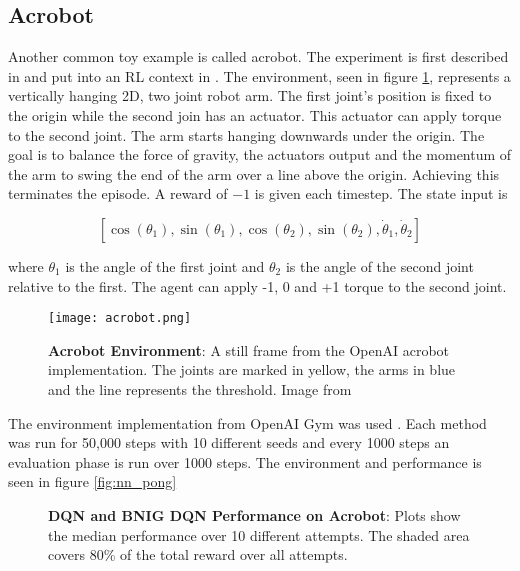 \subsection{Acrobot}

Another common toy example is called acrobot. The experiment is first described in \cite{hauser_1990} and put into an RL context in \cite{sutton_1996}. The environment, seen in figure \ref{fig:acrobot}, represents a vertically hanging 2D, two joint robot arm. The first joint's position is fixed to the origin while the second join has an actuator. This actuator can apply torque to the second joint. The arm starts hanging downwards under the origin. The goal is to balance the force of gravity, the actuators output and the momentum of the arm to swing the end of the arm over a line above the origin. Achieving this terminates the episode. A reward of $-1$ is given each timestep. The state input is

$$
[\cos(\theta_1), \sin(\theta_1), \cos(\theta_2), \sin(\theta_2), \dot{\theta}_1, \dot{\theta}_2]
$$

where $\theta_1$ is the angle of the first joint and $\theta_2$ is the angle of the second joint relative to the first. The agent can apply -1, 0 and +1 torque to the second joint.

\begin{figure}[H]
    \centering
    \texttt{[image: acrobot.png]}
    \caption{\textbf{Acrobot Environment}: A still frame from the OpenAI acrobot implementation. The joints are marked in yellow, the arms in blue and the line represents the threshold. Image from \cite{gym_docs}}
    \label{fig:acrobot}
\end{figure}

The environment implementation from OpenAI Gym was used \citep{brockman_2016}. Each method was run for 50,000 steps with 10 different seeds and every 1000 steps an evaluation phase is run over 1000 steps. The environment and performance is seen in figure \ref{fig:nn_pong} 

\begin{figure}[H]
    \centering
    \caption{\textbf{DQN and BNIG DQN Performance on Acrobot}: Plots show the median performance over 10 different attempts. The shaded area covers 80\% of the total reward over all attempts.}
    \label{fig:nn_acrobot}
\end{figure}

